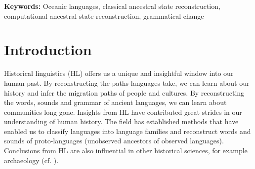\documentclass[12pt,letterpaper]{article}
\begin{document}
\begin{abstract}
\end{abstract}


\noindent\textbf{Keywords:} Oceanic languages, classical ancestral state reconstruction, computational ancestral state reconstruction, grammatical change





\section{Introduction}
\label{acr:intro}
Historical linguistics (HL) offers us a unique and insightful window into our human past. By reconstructing the paths languages take, we can learn about our history and infer the migration paths of people and cultures. By reconstructing the words, sounds and grammar of ancient languages, we can learn about communities long gone. Insights from HL have contributed great strides in our understanding of human history. The field has established methods that have enabled us to classify languages into language families and reconstruct words and sounds of proto-languages (unobserved ancestors of observed languages). Conclusions from HL are also influential in other historical sciences, for example archaeology (cf. \citealt[S364]{bellwood2011holocene}).
\end{document}
